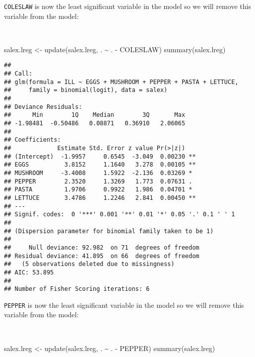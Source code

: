 \documentclass[
  12pt,
  a4paper]{book}
\newenvironment{Shaded}{\begin{snugshade}}{\end{snugshade}}
\newcommand{\FunctionTok}[1]{\textcolor[rgb]{0.00,0.00,0.00}{#1}}
\newcommand{\NormalTok}[1]{#1}
\newcommand{\OtherTok}[1]{\textcolor[rgb]{0.56,0.35,0.01}{#1}}
\newcommand{\SpecialCharTok}[1]{\textcolor[rgb]{0.00,0.00,0.00}{#1}}
\begin{document}
\newpage

\texttt{COLESLAW} is now the least significant variable in the model so we will remove this variable from the model:

~

\begin{Shaded}
\begin{Highlighting}[]
\NormalTok{salex.lreg }\OtherTok{\textless{}{-}} \FunctionTok{update}\NormalTok{(salex.lreg, . }\SpecialCharTok{\textasciitilde{}}\NormalTok{ . }\SpecialCharTok{{-}}\NormalTok{ COLESLAW)}
\FunctionTok{summary}\NormalTok{(salex.lreg)}
\end{Highlighting}
\end{Shaded}

\begin{verbatim}
## 
## Call:
## glm(formula = ILL ~ EGGS + MUSHROOM + PEPPER + PASTA + LETTUCE, 
##     family = binomial(logit), data = salex)
## 
## Deviance Residuals: 
##      Min        1Q    Median        3Q       Max  
## -1.98481  -0.50486   0.08871   0.36910   2.06065  
## 
## Coefficients:
##             Estimate Std. Error z value Pr(>|z|)   
## (Intercept)  -1.9957     0.6545  -3.049  0.00230 **
## EGGS          3.8152     1.1640   3.278  0.00105 **
## MUSHROOM     -3.4008     1.5922  -2.136  0.03269 * 
## PEPPER        2.3520     1.3269   1.773  0.07631 . 
## PASTA         1.9706     0.9922   1.986  0.04701 * 
## LETTUCE       3.4786     1.2246   2.841  0.00450 **
## ---
## Signif. codes:  0 '***' 0.001 '**' 0.01 '*' 0.05 '.' 0.1 ' ' 1
## 
## (Dispersion parameter for binomial family taken to be 1)
## 
##     Null deviance: 92.982  on 71  degrees of freedom
## Residual deviance: 41.895  on 66  degrees of freedom
##   (5 observations deleted due to missingness)
## AIC: 53.895
## 
## Number of Fisher Scoring iterations: 6
\end{verbatim}

\newpage

\texttt{PEPPER} is now the least significant variable in the model so we will remove this variable from the model:

~

\begin{Shaded}
\begin{Highlighting}[]
\NormalTok{salex.lreg }\OtherTok{\textless{}{-}} \FunctionTok{update}\NormalTok{(salex.lreg, . }\SpecialCharTok{\textasciitilde{}}\NormalTok{ . }\SpecialCharTok{{-}}\NormalTok{ PEPPER)}
\FunctionTok{summary}\NormalTok{(salex.lreg)}
\end{Highlighting}
\end{Shaded}
\end{document}
